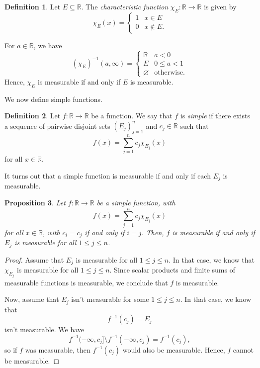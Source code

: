 \documentclass[a4paper, openany]{memoir}
\theoremstyle{definition}
\newtheorem{definition}{Definition}[section]
\theoremstyle{plain}
\newtheorem{proposition}[definition]{Proposition}
\begin{document}
    \begin{definition}
        Let $E \subseteq \mathbb{R}$. The \emph{characteristic function} $\chi_E \colon \mathbb{R} \to \mathbb{R}$ is given by
        \[\chi_E(x) = \begin{cases}
            1 & x \in E \\
            0 & x \not\in E.
        \end{cases}\]
    \end{definition}
    \noindent For $a \in \mathbb{R}$, we have
    \[(\chi_E)^{-1}(a, \infty) = \begin{cases}
        \mathbb{R} & a < 0 \\
        E & 0 \leq a < 1 \\
        \varnothing & \textrm{otherwise}.
    \end{cases}\]
    Hence, $\chi_E$ is measurable if and only if $E$ is measurable. 
    
    We now define simple functions.
    \begin{definition}
        Let $f \colon \mathbb{R} \to \mathbb{R}$ be a function. We say that $f$ is \emph{simple} if there exists a sequence of pairwise disjoint sets $(E_j)_{j=1}^n$ and $c_j \in \mathbb{R}$ such that
        \[f(x) = \sum_{j=1}^n c_j \chi_{E_j}(x)\]
        for all $x \in \mathbb{R}$. 
    \end{definition}
    \noindent It turns out that a simple function is measurable if and only if each $E_j$ is measurable.
    \begin{proposition}
        Let $f \colon \mathbb{R} \to \mathbb{R}$ be a simple function, with
        \[f(x) = \sum_{j=1}^n c_j \chi_{E_j}(x)\]
        for all $x \in \mathbb{R}$, with $c_i = c_j$ if and only if $i = j$. Then, $f$ is measurable if and only if $E_j$ is measurable for all $1 \leq j \leq n$.
    \end{proposition}
    \begin{proof}
        Assume that $E_j$ is measurable for all $1 \leq j \leq n$. In that case, we know that $\chi_{E_j}$ is measurable for all $1 \leq j \leq n$. Since scalar products and finite sums of measurable functions is measurable, we conclude that $f$ is measurable.

        Now, assume that $E_j$ isn't measurable for some $1 \leq j \leq n$. In that case, we know that
        \[f^{-1}(c_j) = E_j\]
        isn't measurable. We have
        \[f^{-1}(-\infty, c_j] \setminus f^{-1}(-\infty, c_j) = f^{-1}(c_j),\]
        so if $f$ was measurable, then $f^{-1}(c_j)$ would also be measurable. Hence, $f$ cannot be measurable.
    \end{proof}
    
\end{document}
